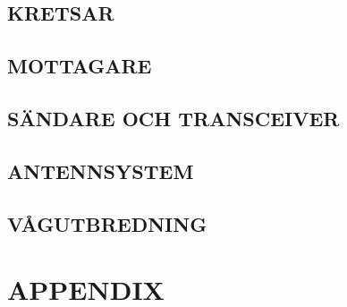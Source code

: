 \documentclass[a4paper,twoside,twocolumn,openright]{book}
\begin{document}
\chapter{KRETSAR}

\cleardoublepage

\cleardoublepage

\cleardoublepage

\cleardoublepage

\cleardoublepage

\cleardoublepage

\cleardoublepage

\cleardoublepage


\chapter{MOTTAGARE}

\cleardoublepage

\cleardoublepage

\cleardoublepage

\cleardoublepage

\cleardoublepage

\cleardoublepage

\cleardoublepage

\cleardoublepage


\chapter{SÄNDARE OCH TRANSCEIVER}

\cleardoublepage


\chapter{ANTENNSYSTEM}

\cleardoublepage

\cleardoublepage

\cleardoublepage

\cleardoublepage

\cleardoublepage


\chapter{VÅGUTBREDNING}

\cleardoublepage

\cleardoublepage

\cleardoublepage

\cleardoublepage












\appendix
\part{APPENDIX}













\listoffigures
\listoftables

\backmatter

\printindex
\end{document}
